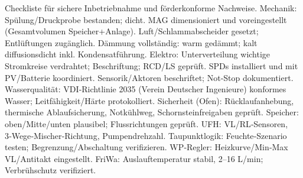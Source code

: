 \markdownRendererDocumentBegin
\markdownRendererSectionBegin
{}\markdownRendererInterblockSeparator
{}Checkliste für sichere Inbetriebnahme und förderkonforme Nachweise.\markdownRendererInterblockSeparator
{}\markdownRendererSectionBegin
{}\markdownRendererInterblockSeparator
{}\markdownRendererUlBeginTight
\markdownRendererUlItem Mechanik:\markdownRendererUlItemEnd 
\markdownRendererUlItem Spülung/Druckprobe bestanden; dicht.\markdownRendererUlItemEnd 
\markdownRendererUlItem MAG dimensioniert und voreingestellt (Gesamtvolumen Speicher+Anlage).\markdownRendererUlItemEnd 
\markdownRendererUlItem Luft/Schlammabscheider gesetzt; Entlüftungen zugänglich.\markdownRendererUlItemEnd 
\markdownRendererUlItem Dämmung vollständig: warm gedämmt; kalt diffusionsdicht inkl. Kondensatführung.\markdownRendererUlItemEnd 
\markdownRendererUlItem Elektro:\markdownRendererUlItemEnd 
\markdownRendererUlItem Unterverteilung wichtige Stromkreise verdrahtet; Beschriftung; RCD/LS geprüft.\markdownRendererUlItemEnd 
\markdownRendererUlItem SPDs installiert und mit PV/Batterie koordiniert.\markdownRendererUlItemEnd 
\markdownRendererUlItem Sensorik/Aktoren beschriftet; Not‑Stop dokumentiert.\markdownRendererUlItemEnd 
\markdownRendererUlItem Wasserqualität:\markdownRendererUlItemEnd 
\markdownRendererUlItem VDI‑Richtlinie 2035 (Verein Deutscher Ingenieure) konformes Wasser; Leitfähigkeit/Härte protokolliert.\markdownRendererUlItemEnd 
\markdownRendererUlItem Sicherheit (Ofen):\markdownRendererUlItemEnd 
\markdownRendererUlItem Rücklaufanhebung, thermische Ablaufsicherung, Notkühlweg, Schornsteinfreigaben geprüft.\markdownRendererUlItemEnd 
\markdownRendererUlEndTight \markdownRendererInterblockSeparator
{}
\markdownRendererSectionEnd \markdownRendererSectionBegin
{}\markdownRendererInterblockSeparator
{}\markdownRendererUlBeginTight
\markdownRendererUlItem Speicher: oben/Mitte/unten plausibel; Flussrichtungen geprüft.\markdownRendererUlItemEnd 
\markdownRendererUlItem UFH: VL/RL‑Sensoren, 3‑Wege‑Mischer‑Richtung, Pumpendrehzahl.\markdownRendererUlItemEnd 
\markdownRendererUlItem Taupunktlogik: Feuchte‑Szenario testen; Begrenzung/Abschaltung verifizieren.\markdownRendererUlItemEnd 
\markdownRendererUlItem WP‑Regler: Heizkurve/Min‑Max VL/Antitakt eingestellt.\markdownRendererUlItemEnd 
\markdownRendererUlItem FriWa: Auslauftemperatur stabil, 2–16 L/min; Verbrühschutz verifiziert.\markdownRendererUlItemEnd 
\markdownRendererUlEndTight \markdownRendererInterblockSeparator
